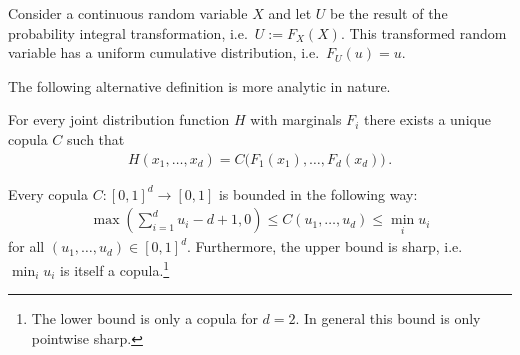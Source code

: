     \begin{property}
        Consider a continuous random variable $X$ and let $U$ be the result of the probability integral transformation, i.e.~$U:=F_X(X)$. This transformed random variable has a uniform cumulative distribution, i.e.~$F_U(u)=u$.
    \end{property}

    The following alternative definition is more analytic in nature.

    \begin{theorem}[Sklar]
        For every joint distribution function $H$ with marginals $F_i$ there exists a unique copula $C$ such that
        \begin{gather}
            H(x_1,\ldots,x_d) = C\bigl(F_1(x_1),\ldots,F_d(x_d)\bigr)\,.
        \end{gather}
    \end{theorem}

    \begin{property}
        Every copula $C:[0,1]^d\rightarrow[0,1]$ is bounded in the following way:
        \begin{gather}
            \max\left(\sum_{i=1}^du_i-d+1,0\right)\leq C(u_1,\ldots,u_d)\leq \min_iu_i
        \end{gather}
        for all $(u_1,\ldots,u_d)\in[0,1]^d$. Furthermore, the upper bound is sharp, i.e.~$\min_iu_i$ is itself a copula.\footnote{The lower bound is only a copula for $d=2$. In general this bound is only pointwise sharp.}
    \end{property}

